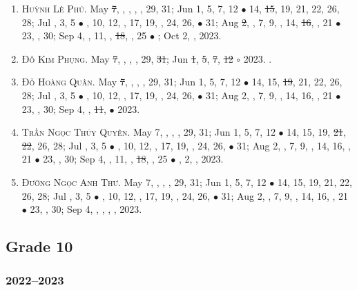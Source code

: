 \documentclass{article}
\begin{document}
\begin{enumerate}
	\item \textsc{Huỳnh Lê Phú.} May \st{7}, , , , , 29, 31; Jun 1, 5, 7, 12 $\bullet$ 14, \st{15}, 19, 21, 22, 26, 28; Jul , 3, 5 $\bullet$ , 10, 12, , 17, 19, , 24, 26,  $\bullet$ 31; Aug \st{2}, , 7, 9, , 14, \st{16}, , 21 $\bullet$ 23, , 30; Sep 4, , 11, , \st{18}, , 25 $\bullet$ ; Oct 2, , 2023.
	\item \textsc{Đỗ Kim Phụng.} May \st{7}, , , , 29, \st{31}; Jun \st{1}, \st{5}, \st{7}, \st{12} $\circ$ 2023. {}. {\sf[Out]}
	\item \textsc{Đỗ Hoàng Quân.} May \st{7}, , , , 29, 31; Jun 1, 5, 7, 12 $\bullet$ 14, 15, \st{19}, 21, 22, 26, 28; Jul , 3, 5 $\bullet$ , 10, 12, , 17, 19, , 24, 26,  $\bullet$ 31; Aug 2, , 7, 9, , 14, 16, , 21 $\bullet$ 23, , 30; Sep 4, , \st{11},  $\bullet$ 2023. {\sf[Out]}
	\item \textsc{Trần Ngọc Thúy Quyên.} May 7, , , , 29, 31; Jun 1, 5, 7, 12 $\bullet$ 14, 15, 19, \st{21}, \st{22}, 26, 28; Jul , 3, 5 $\bullet$ , 10, 12, , 17, 19, , 24, 26,  $\bullet$ 31; Aug 2, , 7, 9, , 14, 16, , 21 $\bullet$ 23, , 30; Sep 4, , 11, , \st{18}, , 25 $\bullet$ , 2, , 2023.
	\item \textsc{Đường Ngọc Anh Thư.} May 7, , , , 29, 31; Jun 1, 5, 7, 12 $\bullet$ 14, 15, 19, 21, 22, 26, 28; Jul , 3, 5 $\bullet$ , 10, 12, , 17, 19, , 24, 26,  $\bullet$ 31; Aug 2, , 7, 9, , 14, 16, , 21 $\bullet$ 23, , 30; Sep 4, , , , , 2023.
\end{enumerate}


\subsection{Grade 10}

\subsubsection{2022--2023}
\end{document}

